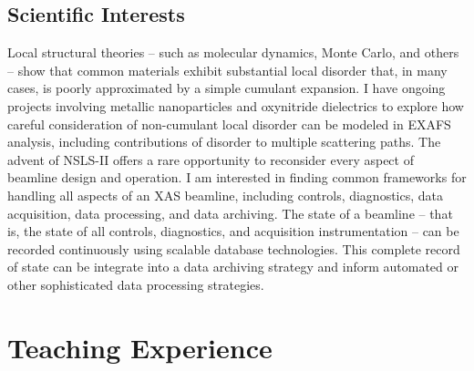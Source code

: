 \documentclass[11pt]{moderncv}
\begin{document}
\subsection{Scientific Interests}
%
{Local structural theories -- such as molecular dynamics, Monte Carlo,
  and others -- show that common materials exhibit substantial local
  disorder that, in many cases, is poorly approximated by a simple
  cumulant expansion.  I have ongoing projects involving metallic
  nanoparticles and oxynitride dielectrics to explore how careful
  consideration of non-cumulant local disorder can be modeled in EXAFS
  analysis, including contributions of disorder to multiple scattering
  paths.}
%
%
{The advent of NSLS-II offers a rare opportunity to reconsider every
  aspect of beamline design and operation.  I am interested in finding
  common frameworks for handling all aspects of an XAS beamline,
  including controls, diagnostics, data acquisition, data processing,
  and data archiving.  The state of a beamline -- that is, the state
  of all controls, diagnostics, and acquisition instrumentation -- can
  be recorded continuously using scalable database technologies.  This
  complete record of state can be integrate into a data archiving
  strategy and inform automated or other sophisticated data processing
  strategies.}


\section{Teaching Experience}
\end{document}
